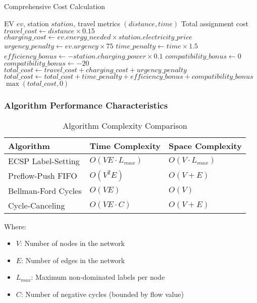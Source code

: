 \documentclass[12pt,a4paper]{article}
\begin{document}
\begin{algorithm}
\caption{Comprehensive Cost Calculation}
\begin{algorithmic}[1]
\REQUIRE EV $ev$, station $station$, travel metrics $(distance, time)$
\ENSURE Total assignment cost
\STATE $travel\_cost \leftarrow distance \times 0.15$ 
\STATE $charging\_cost \leftarrow ev.energy\_needed \times station.electricity\_price$
\STATE $urgency\_penalty \leftarrow ev.urgency \times 75$
\STATE $time\_penalty \leftarrow time \times 1.5$
\STATE $efficiency\_bonus \leftarrow -station.charging\_power \times 0.1$
\STATE $compatibility\_bonus \leftarrow 0$
    \STATE $compatibility\_bonus \leftarrow -20$
\ENDIF
\STATE $total\_cost \leftarrow travel\_cost + charging\_cost + urgency\_penalty$
\STATE $total\_cost \leftarrow total\_cost + time\_penalty + efficiency\_bonus + compatibility\_bonus$
\RETURN $\max(total\_cost, 0)$ 
\end{algorithmic}
\end{algorithm}

\subsubsection{Algorithm Performance Characteristics}

\begin{table}[h]
\centering
\caption{Algorithm Complexity Comparison}
\begin{tabular}{@{}lll@{}}
\toprule
Algorithm & Time Complexity & Space Complexity \\
\midrule
ECSP Label-Setting & $O(VE \cdot L_{max})$ & $O(V \cdot L_{max})$ \\
Preflow-Push FIFO & $O(V^2E)$ & $O(V + E)$ \\
Bellman-Ford Cycles & $O(VE)$ & $O(V)$ \\
Cycle-Canceling & $O(VE \cdot C)$ & $O(V + E)$ \\
\bottomrule
\end{tabular}
\end{table}

Where:
\begin{itemize}
    \item $V$: Number of nodes in the network
    \item $E$: Number of edges in the network  
    \item $L_{max}$: Maximum non-dominated labels per node
    \item $C$: Number of negative cycles (bounded by flow value)
\end{itemize}
\end{document}
